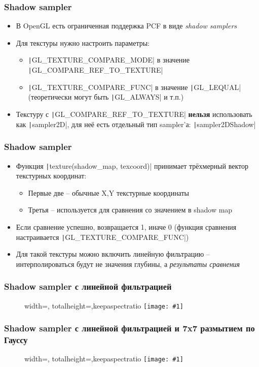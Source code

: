 \documentclass[10pt]{beamer}
\newcommand{\slideimage}[1]{
  \begin{figure}
    \begin{adjustbox}{width=\textwidth, totalheight=\textheight-2\baselineskip-2\baselineskip,keepaspectratio}
      \texttt{[image: \#1]}
    \end{adjustbox}
  \end{figure}
}
\begin{document}
\begin{frame}[fragile]
\frametitle{Shadow sampler}
\begin{itemize}
\item В OpenGL есть ограниченная поддержка PCF в виде \textit{shadow samplers}
\pause
\item Для текстуры нужно настроить параметры:
\begin{itemize}
\item \texttt|GL_TEXTURE_COMPARE_MODE| в значение \texttt|GL_COMPARE_REF_TO_TEXTURE|
\item \texttt|GL_TEXTURE_COMPARE_FUNC| в значение \texttt|GL_LEQUAL| (теоретически могут быть \texttt|GL_ALWAYS| и т.п.)
\end{itemize}
\pause
\item Текстуру с \texttt|GL_COMPARE_REF_TO_TEXTURE| \textbf{нельзя} использовать как \texttt|sampler2D|, для неё есть отдельный тип sampler'а: \texttt|sampler2DShadow|
\end{itemize}
\end{frame}

\begin{frame}[fragile]
\frametitle{Shadow sampler}
\begin{itemize}
\item Функция \texttt|texture(shadow_map, texcoord)| принимает трёхмерный вектор текстурных координат:
\begin{itemize}
\item Первые две -- обычные X,Y текстурные координаты
\item Третья -- используется для сравнения со значением в shadow map
\end{itemize}
\pause
\item Если сравнение успешно, возвращается 1, иначе 0 (функция сравнения настраивается \texttt|GL_TEXTURE_COMPARE_FUNC|)
\pause
\item Для такой текстуры можно включить линейную фильтрацию -- интерполироваться будут не значения глубины, а \textit{результаты сравнения}
\end{itemize}
\end{frame}

\begin{frame}[fragile]
\frametitle{Shadow sampler с линейной фильтрацией}
\slideimage{pcf.png}
\end{frame}

\begin{frame}[fragile]
\frametitle{Shadow sampler с линейной фильтрацией и 7x7 размытием по Гауссу}
\slideimage{pcf_gauss.png}
\end{frame}
\end{document}
